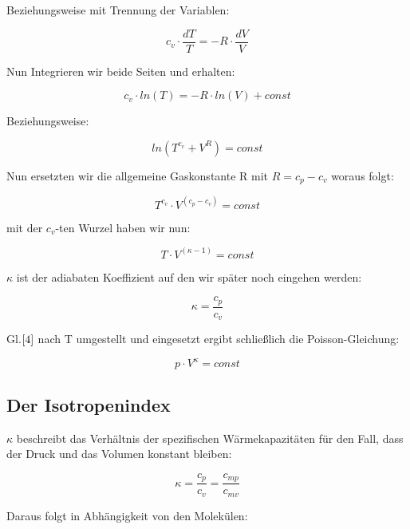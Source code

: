 \documentclass{article}
\begin{document}
{Beziehungsweise mit Trennung der Variablen: 

\begin{equation}
c_{v}\cdot\frac{dT}{T}=-R\cdot\frac{dV}{V}
\end{equation}

Nun Integrieren wir beide Seiten und erhalten:

\begin{equation}
c_{v}\cdot ln(T)=-R\cdot ln(V)+const
\end{equation}

Beziehungsweise:

\begin{equation}
ln(T^{c_{v}} +V^R )=const
\end{equation}

Nun ersetzten wir die allgemeine Gaskonstante R mit \(R=c_{p}-c_{v}\)
woraus folgt:

\begin{equation}
T^{c_{v}}\cdot V^{(c_{p}-c_{v})}=const
\end{equation}

mit der \(c_{v}\)-ten Wurzel haben wir nun:

\begin{equation}
T\cdot V^{(\kappa -1)}=const
\end{equation}

\(\kappa\) ist der adiabaten Koeffizient auf den wir später noch eingehen werden:

\begin{equation}
\kappa =\frac{c_{p}}{c_{v}}
\end{equation}

Gl.\(\eqref{4}\) nach T umgestellt und eingesetzt ergibt schließlich die Poisson-Gleichung:

\begin{equation}
\label{16}
p\cdot V^\kappa =const
\end{equation}

\subsection{Der Isotropenindex}
\(\kappa\) beschreibt das Verhältnis der spezifischen Wärmekapazitäten für den Fall, dass der Druck und das Volumen konstant bleiben:

\begin{equation}
\kappa =\frac{c_{p}}{c_{v}}=\frac{c_{mp}}{c_{mv}}
\end{equation} 

Daraus folgt in Abhängigkeit von den Molekülen:

}
\end{document}

